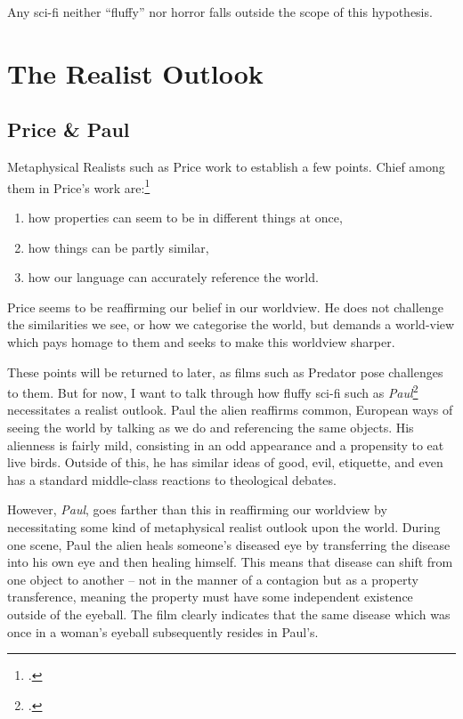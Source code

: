 \documentclass{article}
\begin{document}
Any sci-fi neither ``fluffy'' nor horror falls outside the scope of this hypothesis.

\section{The Realist Outlook}
\subsection{Price \& Paul}
Metaphysical Realists such as Price work to establish a few points. Chief among them in Price's work are:\footcite[p 7-9]{thinkingexperience}

\label{realistgoals}
\begin{enumerate}
\item how properties can seem to be in different things at once,
\item how things can be partly similar,
\item how our language can accurately reference the world.
\end{enumerate}
Price seems to be reaffirming our belief in our worldview. He does not challenge the similarities we see, or how we categorise the world, but demands a world-view which pays homage to them and seeks to make this worldview sharper.

These points will be returned to later, as films such as Predator pose challenges to them. But for now, I want to talk through how fluffy sci-fi such as \textit{Paul}\footcite{paul} necessitates a realist outlook. Paul the alien reaffirms common, European ways of seeing the world by talking as we do and referencing the same objects. His alienness is fairly mild, consisting in an odd appearance and a propensity to eat live birds. Outside of this, he has similar ideas of good, evil, etiquette, and even has a standard middle-class reactions to theological debates.

However, \textit{Paul}, goes farther than this in reaffirming our worldview by necessitating some kind of metaphysical realist outlook upon the world. During one scene, Paul the alien heals someone's diseased eye by transferring the disease into his own eye and then healing himself. This means that disease can shift from one object to another -- not in the manner of a contagion but as a property transference, meaning the property must have some independent existence outside of the eyeball. The film clearly indicates that the same disease which was once in a woman's eyeball
subsequently resides in Paul's.
\end{document}
